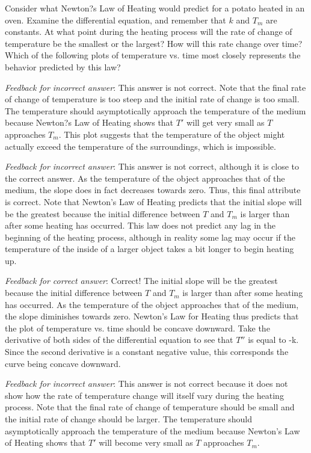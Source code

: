 \documentclass{ximera}
\begin{document}
Consider what Newton?s Law of Heating would predict for a potato heated in an oven.  Examine the differential equation, and remember that $k$ and $T_m$ are constants.  At what point during the heating process will the rate of change of temperature be the smallest or the largest?  How will this rate change over time?  Which of the following plots of temperature vs. time most closely represents the behavior predicted by this law?


\emph{Feedback for incorrect answer}: This answer is not correct.  Note that the final rate of change of temperature is too steep and the initial rate of change is too small.  The temperature should asymptotically approach the temperature of the medium because Newton?s Law of Heating shows that $T'$ will get very small as $T$ approaches $T_m$.  This plot suggests that the temperature of the object might actually exceed the temperature of the surroundings, which is impossible.

\emph{Feedback for incorrect answer}: This answer is not correct, although it is close to the correct answer.  As the temperature of the object approaches that of the medium, the slope does in fact decreases towards zero.  Thus, this final attribute is correct.  Note that Newton's Law of Heating predicts that the initial slope will be the greatest because the initial difference between $T$ and $T_m$ is larger than after some heating has occurred.  This law does not predict any lag in the beginning of the heating process, although in reality some lag may occur if the temperature of the inside of a larger object takes a bit longer to begin heating up.  
 
\emph{Feedback for correct answer}: Correct!  The initial slope will be the greatest because the initial difference between $T$ and $T_m$ is larger than after some heating has occurred.  As the temperature of the object approaches that of the medium, the slope diminishes towards zero.  Newton's Law for Heating thus predicts that the plot of temperature vs. time should be concave downward.  Take the derivative of both sides of the differential equation to see that $T''$ is equal to -k.  Since the second derivative is a constant negative value, this corresponds the curve being concave downward.

 
\emph{Feedback for incorrect answer}: This answer is not correct because it does not show how the rate of temperature change will itself vary during the heating process.  Note that the final rate of change of temperature should be small and the initial rate of change should be larger.  The temperature should asymptotically approach the temperature of the medium because Newton's Law of Heating shows that $T'$ will become very small as $T$ approaches $T_m$.
\end{document}
